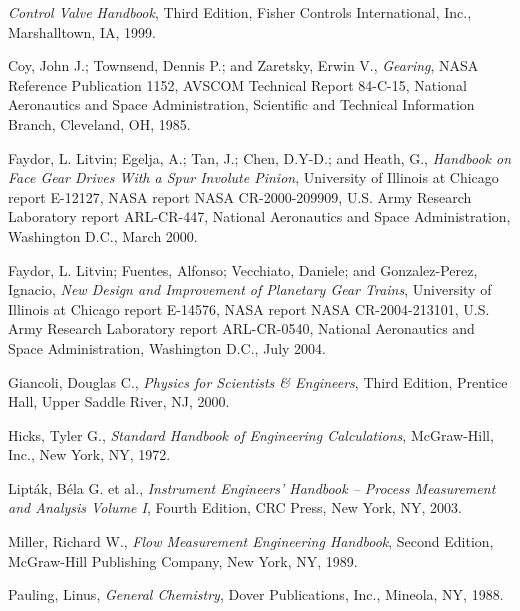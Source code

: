 \vskip 10pt

\noindent
\textit{Control Valve Handbook}, Third Edition, Fisher Controls International, Inc., Marshalltown, IA, 1999.

\vskip 10pt

\noindent
Coy, John J.; Townsend, Dennis P.; and Zaretsky, Erwin V., \textit{Gearing}, NASA Reference Publication 1152, AVSCOM Technical Report 84-C-15, National Aeronautics and Space Administration, Scientific and Technical Information Branch, Cleveland, OH, 1985.

\vskip 10pt

\noindent
Faydor, L. Litvin; Egelja, A.; Tan, J.; Chen, D.Y-D.; and Heath, G., \textit{Handbook on Face Gear Drives With a Spur Involute Pinion}, University of Illinois at Chicago report E-12127, NASA report NASA CR-2000-209909, U.S. Army Research Laboratory report ARL-CR-447, National Aeronautics and Space Administration, Washington D.C., March 2000.

\vskip 10pt

\noindent
Faydor, L. Litvin; Fuentes, Alfonso; Vecchiato, Daniele; and Gonzalez-Perez, Ignacio, \textit{New Design and Improvement of Planetary Gear Trains}, University of Illinois at Chicago report E-14576, NASA report NASA CR-2004-213101, U.S. Army Research Laboratory report ARL-CR-0540, National Aeronautics and Space Administration, Washington D.C., July 2004.

\vskip 10pt

\noindent
Giancoli, Douglas C., \textit{Physics for Scientists \& Engineers}, Third Edition, Prentice Hall, Upper Saddle River, NJ, 2000.

\vskip 10pt

\noindent
Hicks, Tyler G., \textit{Standard Handbook of Engineering Calculations}, McGraw-Hill, Inc., New York, NY, 1972. 

\vskip 10pt

\noindent
Lipt\'ak, B\'ela G. et al., \textit{Instrument Engineers' Handbook -- Process Measurement and Analysis Volume I}, Fourth Edition, CRC Press, New York, NY, 2003.

\vskip 10pt

\noindent
Miller, Richard W., \textit{Flow Measurement Engineering Handbook}, Second Edition, McGraw-Hill Publishing Company, New York, NY, 1989.

\vskip 10pt

\noindent
Pauling, Linus, \textit{General Chemistry}, Dover Publications, Inc., Mineola, NY, 1988.

